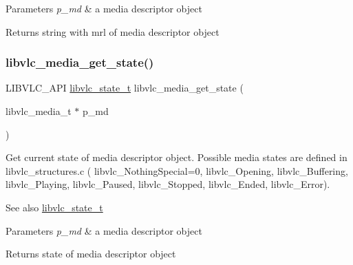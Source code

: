 \begin{DoxyParams}{Parameters}
{\em p\+\_\+md} & a media descriptor object \\
\hline
\end{DoxyParams}
\begin{DoxyReturn}{Returns}
string with mrl of media descriptor object 
\end{DoxyReturn}
\mbox{\label{group__libvlc__media_ga894c92329fb83d8b55f105b4e1fdfbb8}} 
\subsubsection{\texorpdfstring{libvlc\+\_\+media\+\_\+get\+\_\+state()}{libvlc\_media\_get\_state()}}
{\footnotesize\ttfamily L\+I\+B\+V\+L\+C\+\_\+\+A\+PI \hyperlink{group__libvlc__media_gac88ad60037ea05e1f23675a2ebe31efc}{libvlc\+\_\+state\+\_\+t} libvlc\+\_\+media\+\_\+get\+\_\+state (\begin{DoxyParamCaption}\item[{libvlc\+\_\+media\+\_\+t $\ast$}]{p\+\_\+md }\end{DoxyParamCaption})}

Get current state of media descriptor object. Possible media states are defined in libvlc\+\_\+structures.\+c ( libvlc\+\_\+\+Nothing\+Special=0, libvlc\+\_\+\+Opening, libvlc\+\_\+\+Buffering, libvlc\+\_\+\+Playing, libvlc\+\_\+\+Paused, libvlc\+\_\+\+Stopped, libvlc\+\_\+\+Ended, libvlc\+\_\+\+Error).

\begin{DoxySeeAlso}{See also}
\hyperlink{group__libvlc__media_gac88ad60037ea05e1f23675a2ebe31efc}{libvlc\+\_\+state\+\_\+t} 
\end{DoxySeeAlso}

\begin{DoxyParams}{Parameters}
{\em p\+\_\+md} & a media descriptor object \\
\hline
\end{DoxyParams}
\begin{DoxyReturn}{Returns}
state of media descriptor object 
\end{DoxyReturn}
\mbox{\label{group__libvlc__media_ga8043c9dbf07c6286e918d7d38e467c3e}} 
